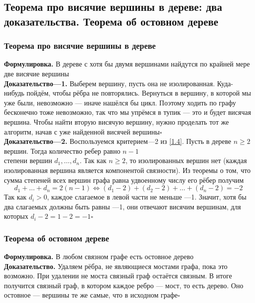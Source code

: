 \documentclass[a4paper]{article}
\begin{document}
\subsection{Теорема про висячие вершины в дереве: два доказательства. Теорема об остовном дереве}
\subsubsection*{Теорема про висячие вершины в дереве}
\textbf{Формулировка.} В дереве с хотя бы двумя вершинами найдутся по крайней мере две висячие вершины\\[2mm]
\indent\textbf{Доказательство—1.} Выберем вершину, пусть она не изолированная. Куда-нибудь пойдём, чтобы рёбра не повторялись. Вернуться в вершину, в которой мы уже были, невозможно — иначе нашёлся бы цикл. Поэтому ходить по графу бесконечно тоже невозможно, так что мы упрёмся в тупик — это и будет висячая вершина. Чтобы найти вторую висячую вершину, нужно проделать тот же алгоритм, начав с уже найденной висячей вершины\hfill$\square$\\[2mm]
\indent\textbf{Доказательство—2.} Воспользуемся критерием—2 из \ref{1.4}. Пусть в дереве $n\geqslant2$ вершин. Тогда количество ребер равно $n-1$\\[2mm]
 степени вершин $d_1,\ldots,d_n$. Так как $n\geqslant2$, то изолированных вершин нет (каждая изолированная вершина является компонентой связности). Из теоремы о том, что сумма степеней всех вершин графа равна удвоенному числу его рёбер получим $$d_1+\ldots+d_n=2(n-1)\iff(d_1-2)+(d_2-2)+\ldots+(d_n-2)=-2$$
Так как $d_i>0$, каждое слагаемое в левой части не меньше —1. Значит, хотя бы два слагаемых должны быть равны —1, они отвечают висячим вершинам, для которых $d_i-2=1-2=-1$\hfill$\square$

\subsubsection*{Теорема об остовном дереве}
\textbf{Формулировка.} В любом связном графе есть остовное дерево\\[2mm]
\indent\textbf{Доказательство.} Удаляем рёбра, не являющиеся мостами графа, пока это возможно. При удалении не моста связный граф остаётся связным. В итоге получится связный граф, в котором каждое ребро — мост, то есть дерево. Оно остовное — вершины те же самые, что в исходном графе\hfill$\square$
\end{document}
